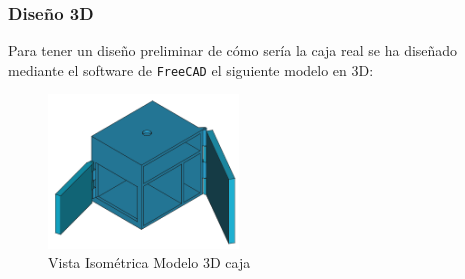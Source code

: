 \subsubsection{Diseño 3D}

Para tener un diseño preliminar de cómo sería la caja real se ha diseñado mediante el software de \texttt{FreeCAD} el siguiente modelo en 3D:

\begin{figure}[H]
    \centering
    \includegraphics[width=0.45\textwidth]{images/4-DesarrolloTeorico/4-1-caja/CAJA_3D_ISOMETRICA.png}
    \caption{Vista Isométrica Modelo 3D caja}
    \label{fig:DesarrolloTeorico/Caja/CAJA_3D_ISOMETRICA}
\end{figure}

